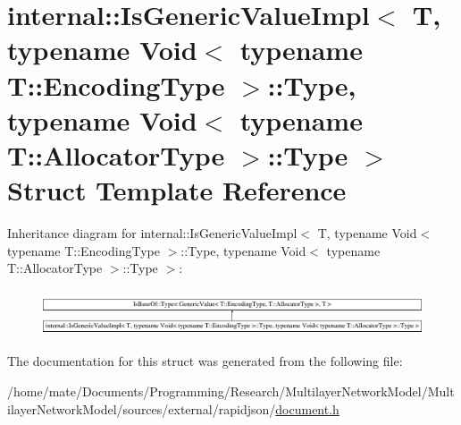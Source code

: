 \hypertarget{structinternal_1_1IsGenericValueImpl_3_01T_00_01typename_01Void_3_01typename_01T_1_1EncodingType794abcc01fcce01e300668fa57e4d036}{}\section{internal\+:\+:Is\+Generic\+Value\+Impl$<$ T, typename Void$<$ typename T\+:\+:Encoding\+Type $>$\+:\+:Type, typename Void$<$ typename T\+:\+:Allocator\+Type $>$\+:\+:Type $>$ Struct Template Reference}
\label{structinternal_1_1IsGenericValueImpl_3_01T_00_01typename_01Void_3_01typename_01T_1_1EncodingType794abcc01fcce01e300668fa57e4d036}
Inheritance diagram for internal\+:\+:Is\+Generic\+Value\+Impl$<$ T, typename Void$<$ typename T\+:\+:Encoding\+Type $>$\+:\+:Type, typename Void$<$ typename T\+:\+:Allocator\+Type $>$\+:\+:Type $>$\+:\begin{figure}[H]
\begin{center}
\leavevmode
\includegraphics[height=1.372549cm]{structinternal_1_1IsGenericValueImpl_3_01T_00_01typename_01Void_3_01typename_01T_1_1EncodingType794abcc01fcce01e300668fa57e4d036}
\end{center}
\end{figure}


The documentation for this struct was generated from the following file\+:\begin{DoxyCompactItemize}
\item 
/home/mate/\+Documents/\+Programming/\+Research/\+Multilayer\+Network\+Model/\+Multilayer\+Network\+Model/sources/external/rapidjson/\hyperlink{document_8h}{document.\+h}\end{DoxyCompactItemize}
